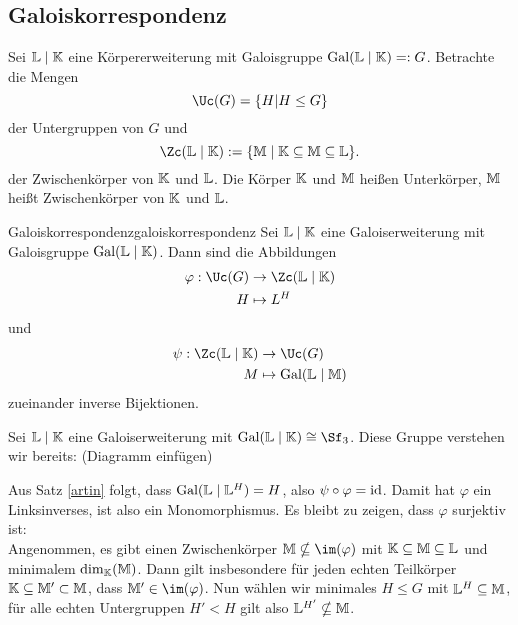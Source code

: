\subsection{Galoiskorrespondenz}
\label{subsec:galoiskorrespondenz}

Sei $\mathbb{L} \mid \mathbb{K}$ eine Körpererweiterung mit Galoisgruppe $\operatorname{\text{Gal}}(\mathbb{L}\mid \mathbb{K}) =: G$. Betrachte die Mengen
\begin{equation}
\Uc(G) = \{H | H \leq G\}
\end{equation}
der Untergruppen von $G$ und
\begin{equation}
\Zc(\L \mid \K) := \{\M \mid \K \sub \M \sub \L\}.
\end{equation}
der Zwischenkörper von $\mathbb{K}$ und $\mathbb{L}$. Die Körper $\mathbb{K}$ und $\mathbb{M}$ heißen Unterkörper, $\mathbb{M}$ heißt Zwischenkörper von $\mathbb{K}$ und $\mathbb{L}$.
\begin{theorem}{Galoiskorrespondenz}{galoiskorrespondenz}
Sei $\mathbb{L} \mid \mathbb{K}$ eine Galoiserweiterung mit Galoisgruppe $\operatorname{\text{Gal}}(\mathbb{L} \mid \mathbb{K})$. Dann sind die Abbildungen
\begin{equation}
\begin{split}
\varphi: \Uc (G) &\to \Zc (\L \mid \K)\\
H &\mapsto L^H
\end{split}
\end{equation}
und
\begin{equation}
\begin{split}
\psi: \Zc (\L \mid \K) &\to \Uc (G)\\
M &\mapsto \Gal(\L \mid \M)
\end{split}
\end{equation}
zueinander inverse Bijektionen.
\end{theorem}
\begin{beispiel}
Sei $\mathbb{L} \mid \mathbb{K}$ eine Galoiserweiterung mit $\Gal(\L \mid \K) \cong \Sf_3$. Diese Gruppe verstehen wir bereits: (Diagramm einfügen)
\end{beispiel}
\begin{beweis}
Aus Satz \ref{artin} folgt, dass $\operatorname{\text{Gal}} (\mathbb{L} \mid \mathbb{L}^H) = H$, also $\psi \circ \varphi = \text{id}$. Damit hat $\varphi$ ein Linksinverses, ist also ein Monomorphismus. Es bleibt zu zeigen, dass $\varphi$ surjektiv ist:\\
Angenommen, es gibt einen Zwischenkörper $\M \nsubseteq \im(\varphi)$ mit $\mathbb{K} \subseteq \mathbb{M} \subseteq \mathbb{L}$ und minimalem $\dim_{\mathbb{K}}(\mathbb{M})$. Dann gilt insbesondere für jeden echten Teilkörper $\mathbb{K} \subseteq \mathbb{M}' \subset \mathbb{M}$, dass $\M' \in \im(\varphi)$. Nun wählen wir minimales $H \leq G$ mit $\mathbb{L}^H \subseteq \mathbb{M}$, für alle echten Untergruppen $H' < H$ gilt also $\mathbb{L}^{H'} \nsubseteq \mathbb{M}$.
\end{beweis}
